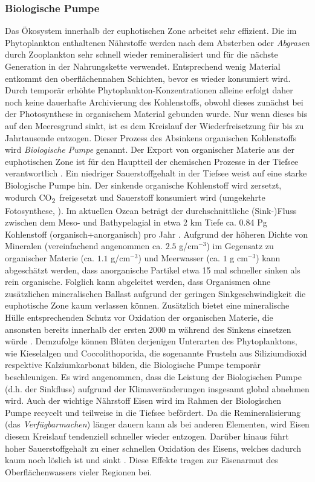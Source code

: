 \documentclass[12pt,a4paper,onecolumn]{scrartcl}
\newcommand{\cotwo}{CO\textsubscript{2}}
\begin{document}
\subsubsection{Biologische Pumpe} \label{sec:biopump}
Das Ökosystem innerhalb der euphotischen Zone arbeitet sehr effizient. Die im Phytoplankton enthaltenen Nährstoffe werden nach dem Absterben oder \textit{Abgrasen} durch Zooplankton sehr schnell wieder remineralisiert und für die nächste Generation in der Nahrungskette verwendet. Entsprechend wenig Material entkommt den oberflächennahen Schichten, bevor es wieder konsumiert wird. Durch temporär erhöhte Phytoplankton-Konzentrationen alleine erfolgt daher noch keine dauerhafte Archivierung des Kohlenstoffs, obwohl dieses zunächst bei der Photosynthese in organischem Material gebunden wurde. Nur wenn dieses bis auf den Meeresgrund sinkt, ist es dem Kreislauf der Wiederfreisetzung für bis zu Jahrtausende entzogen. Dieser Prozess des Absinkens organischen Kohlenstoffs wird \textit{Biologische Pumpe} genannt. Der Export von organischer Materie aus der euphotischen Zone ist für den Hauptteil der chemischen Prozesse in der Tiefsee verantwortlich \citep{Emerson.2009}. Ein niedriger Sauerstoffgehalt in der Tiefsee weist auf eine starke Biologische Pumpe hin. Der sinkende organische Kohlenstoff wird zersetzt, wodurch \cotwo \ freigesetzt und Sauerstoff konsumiert wird (umgekehrte Fotosynthese, \cite{Honjo.2008}). Im aktuellen Ozean beträgt der durchschnittliche (Sink-)Fluss zwischen dem Meso- und Bathypelagial in etwa 2 km Tiefe ca. 0.84 Pg Kohlenstoff (organisch+anorganisch) pro Jahr \citep{Honjo.2008}. Aufgrund der höheren Dichte von Mineralen (vereinfachend angenommen ca. $2.5$ g/cm$^{-3}$) im Gegensatz zu organischer Materie (ca. $1.1$ g/cm$^{-3}$) und Meerwasser (ca. $1$ g cm$^{-3}$) kann abgeschätzt werden, dass anorganische Partikel etwa 15 mal schneller sinken als rein organische. Folglich kann abgeleitet werden, dass Organismen ohne zusätzlichen mineralischen Ballast aufgrund der geringen Sinkgeschwindigkeit die euphotische Zone kaum verlassen können. Zusätzlich bietet eine mineralische Hülle entsprechenden Schutz vor Oxidation der organischen Materie, die ansonsten bereits innerhalb der ersten 2000 m während des Sinkens einsetzen würde \citep{Emerson.2009}. Demzufolge können Blüten derjenigen Unterarten des Phytoplanktons, wie Kieselalgen und Coccolithoporida, die sogenannte Frusteln aus Siliziumdioxid respektive Kalziumkarbonat bilden, die Biologische Pumpe temporär beschleunigen. Es wird angenommen, dass die Leistung der Biologischen Pumpe (d.h. der Sinkfluss) aufgrund der Klimaveränderungen insgesamt global abnehmen wird. Auch der wichtige Nährstoff Eisen wird im Rahmen der Biologischen Pumpe recycelt und teilweise in die Tiefsee befördert. Da die Remineralisierung (das \textit{Verfügbarmachen}) länger dauern kann als bei anderen Elementen, wird Eisen diesem Kreislauf tendenziell schneller wieder entzogen. Darüber hinaus führt hoher Sauerstoffgehalt zu einer schnellen Oxidation des Eisens, welches dadurch kaum noch löslich ist und sinkt \citep{Falkowski.1998}. Diese  Effekte tragen zur Eisenarmut des Oberflächenwassers vieler Regionen bei.
\end{document}
